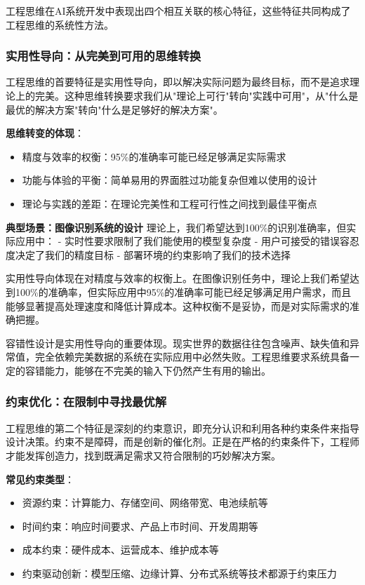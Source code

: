 工程思维在AI系统开发中表现出四个相互关联的核心特征，这些特征共同构成了工程思维的系统性方法。


\subsubsection{实用性导向：从完美到可用的思维转换}
工程思维的首要特征是实用性导向，即以解决实际问题为最终目标，而不是追求理论上的完美。这种思维转换要求我们从"理论上可行"转向"实践中可用"，从"什么是最优的解决方案"转向"什么是足够好的解决方案"。

\textbf{思维转变的体现}：
\begin{itemize}
\item 精度与效率的权衡：95\%的准确率可能已经足够满足实际需求
\item 功能与体验的平衡：简单易用的界面胜过功能复杂但难以使用的设计
\item 理论与实践的差距：在理论完美性和工程可行性之间找到最佳平衡点
\end{itemize}

\textbf{典型场景：图像识别系统的设计}
理论上，我们希望达到100\%的识别准确率，但实际应用中：
- 实时性要求限制了我们能使用的模型复杂度
- 用户可接受的错误容忍度决定了我们的精度目标
- 部署环境的约束影响了我们的技术选择

实用性导向体现在对精度与效率的权衡上。在图像识别任务中，理论上我们希望达到100\%的准确率，但实际应用中95\%的准确率可能已经足够满足用户需求，而且能够显著提高处理速度和降低计算成本。这种权衡不是妥协，而是对实际需求的准确把握。

容错性设计是实用性导向的重要体现。现实世界的数据往往包含噪声、缺失值和异常值，完全依赖完美数据的系统在实际应用中必然失败。工程思维要求系统具备一定的容错能力，能够在不完美的输入下仍然产生有用的输出。


\subsubsection{约束优化：在限制中寻找最优解}

工程思维的第二个特征是深刻的约束意识，即充分认识和利用各种约束条件来指导设计决策。约束不是障碍，而是创新的催化剂。正是在严格的约束条件下，工程师才能发挥创造力，找到既满足需求又符合限制的巧妙解决方案。

 \textbf{常见约束类型}：
\begin{itemize}
 \item 资源约束：计算能力、存储空间、网络带宽、电池续航等
 \item 时间约束：响应时间要求、产品上市时间、开发周期等
 \item 成本约束：硬件成本、运营成本、维护成本等
 \item 约束驱动创新：模型压缩、边缘计算、分布式系统等技术都源于约束压力
\end{itemize}

